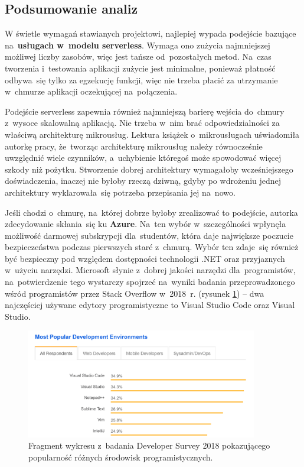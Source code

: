 \documentclass[12pt,a4paper,twoside,titlepage,openright]{book}
\begin{document}
\subsection{Podsumowanie analiz}

W świetle wymagań stawianych projektowi, najlepiej wypada podejście bazujące na~\textbf{usługach w~modelu serverless}. Wymaga ono zużycia najmniejszej możliwej liczby zasobów, więc jest tańsze od~pozostałych metod. Na~czas tworzenia i~testowania aplikacji zużycie jest minimalne, ponieważ płatność odbywa~się tylko za egzekucję funkcji, więc nie trzeba płacić za utrzymanie w~chmurze aplikacji oczekującej na~połączenia. 

Podejście serverless zapewnia również najmniejszą barierę wejścia do~chmury z~wysoce skalowalną aplikacją. Nie trzeba w~nim brać odpowiedzialności za właściwą architekturę mikrousług. Lektura książek\cite{microservicesPacktNetCore, microservicesSusan, microservicesWmii} o~mikrousługach uświadomiła autorkę pracy, że~tworząc architekturę mikrousług należy równocześnie uwzględnić wiele czynników, a~uchybienie któregoś może spowodować więcej szkody niż pożytku. Stworzenie dobrej architektury wymagałoby wcześniejszego doświadczenia, inaczej nie byłoby rzeczą dziwną, gdyby po wdrożeniu jednej architektury wyklarowała~się potrzeba przepisania jej na~nowo.

Jeśli chodzi o~chmurę, na~której dobrze byłoby zrealizować to podejście, autorka zdecydowanie skłania~się ku \textbf{Azure}. Na~ten wybór w~szczególności wpłynęła możliwość darmowej subskrypcji dla~studentów, która daje największe poczucie bezpieczeństwa podczas pierwszych starć z~chmurą. Wybór ten zdaje~się również być bezpieczny pod względem dostępności technologii .NET oraz przyjaznych w~użyciu narzędzi. Microsoft słynie z~dobrej jakości narzędzi dla~programistów, na~potwierdzenie tego wystarczy spojrzeć na~wyniki badania przeprowadzonego wśród programistów przez Stack Overflow w~2018~r. (rysunek \ref{fig:stackOverflowSurvey}) -- dwa najczęściej używane edytory programistyczne to Visual Studio Code oraz Visual Studio. 

\begin{figure}[h]
	\centering
			\includegraphics[width=0.9\textwidth]{stackOverflowSurvey.png}
		\caption{Fragment wykresu z~badania Developer Survey 2018 pokazującego popularność różnych środowisk programistycznych. \cite{siteStackOverflowSurvey}}
		\label{fig:stackOverflowSurvey}
\end{figure} 
\end{document}
